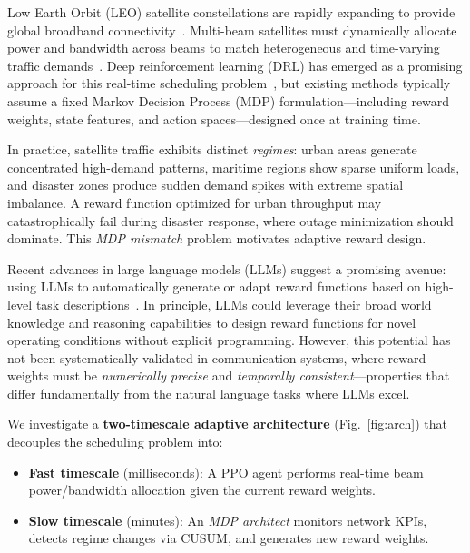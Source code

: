 \documentclass[conference]{IEEEtran}
\begin{document}
Low Earth Orbit (LEO) satellite constellations are rapidly expanding to provide global broadband connectivity~\cite{starlink}. Multi-beam satellites must dynamically allocate power and bandwidth across beams to match heterogeneous and time-varying traffic demands~\cite{beam_hopping}. Deep reinforcement learning (DRL) has emerged as a promising approach for this real-time scheduling problem~\cite{drl_satcom1}, but existing methods typically assume a fixed Markov Decision Process (MDP) formulation---including reward weights, state features, and action spaces---designed once at training time.

In practice, satellite traffic exhibits distinct \emph{regimes}: urban areas generate concentrated high-demand patterns, maritime regions show sparse uniform loads, and disaster zones produce sudden demand spikes with extreme spatial imbalance. A reward function optimized for urban throughput may catastrophically fail during disaster response, where outage minimization should dominate. This \emph{MDP mismatch} problem motivates adaptive reward design.

Recent advances in large language models (LLMs) suggest a promising avenue: using LLMs to automatically generate or adapt reward functions based on high-level task descriptions~\cite{ma2023eureka}. In principle, LLMs could leverage their broad world knowledge and reasoning capabilities to design reward functions for novel operating conditions without explicit programming. However, this potential has not been systematically validated in communication systems, where reward weights must be \emph{numerically precise} and \emph{temporally consistent}---properties that differ fundamentally from the natural language tasks where LLMs excel.

We investigate a \textbf{two-timescale adaptive architecture} (Fig.~\ref{fig:arch}) that decouples the scheduling problem into:
\begin{itemize}
\item \textbf{Fast timescale} (milliseconds): A PPO agent performs real-time beam power/bandwidth allocation given the current reward weights.
\item \textbf{Slow timescale} (minutes): An \emph{MDP architect} monitors network KPIs, detects regime changes via CUSUM, and generates new reward weights.
\end{itemize}
\end{document}
